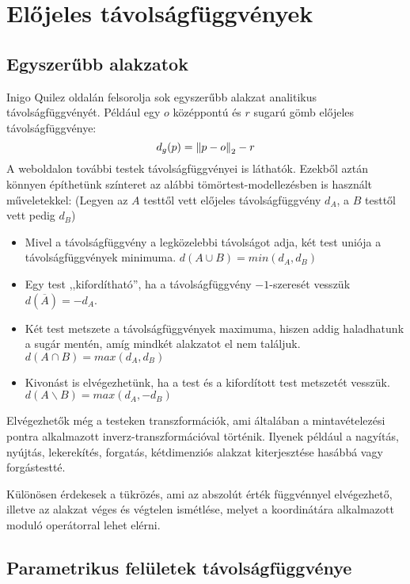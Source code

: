 \section{Előjeles távolságfüggvények}


\subsection{Egyszerűbb alakzatok}
Inigo Quilez oldalán \cite{QuilezDistanceFunctions} felsorolja sok egyszerűbb alakzat analitikus távolságfüggvényét. Például egy $o$ középpontú és $r$ sugarú gömb előjeles távolságfüggvénye:
$$ d_{g}(p) = \norm{p-o}_2 - r $$
A weboldalon további testek távolságfüggvényei is láthatók. Ezekből aztán könnyen építhetünk színteret az alábbi tömörtest-modellezésben is használt műveletekkel: (Legyen az $A$ testtől vett előjeles távolságfüggvény $d_A$, a $B$ testtől vett pedig $d_B$)

\begin{itemize}
	\item Mivel a távolságfüggvény a legközelebbi távolságot adja, két test uniója a távolságfüggvények minimuma. $d(A\cup B) = min(d_A, d_B)$
	\item  Egy test ,,kifordítható'', ha a távolságfüggvény $-1$-szeresét vesszük $d\left(\overline{A}\right) = -d_A$.
	\item Két test metszete a távolságfüggvények maximuma, hiszen addig haladhatunk a sugár mentén, amíg mindkét alakzatot el nem találjuk. $d(A\cap B) = max(d_A, d_B)$
	\item Kivonást is elvégezhetünk, ha a test és a kifordított test metszetét vesszük. $d(A\backslash B) = max(d_A,-d_B)$ 
\end{itemize}

Elvégezhetők még a testeken transzformációk, ami általában a mintavételezési pontra alkalmazott inverz-transzformációval történik. Ilyenek például a nagyítás, nyújtás, lekerekítés, forgatás, kétdimenziós alakzat kiterjesztése hasábbá vagy forgástestté.

Különösen érdekesek a tükrözés, ami az abszolút érték függvénnyel elvégezhető, illetve az alakzat véges és végtelen ismétlése, melyet a koordinátára alkalmazott moduló operátorral lehet elérni. \cite{QuilezDistanceFunctions}


\subsection{Parametrikus felületek távolságfüggvénye}

